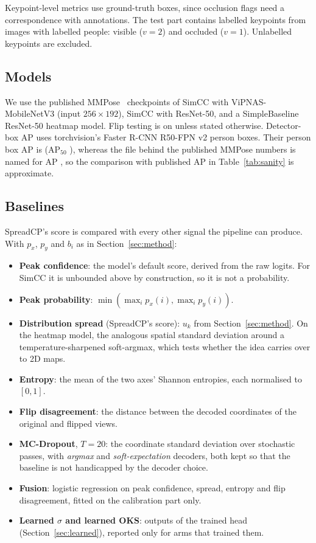 \documentclass[preprint,11pt]{elsarticle}
\newcommand{\method}{SpreadCP}
\begin{document}
Keypoint-level metrics use ground-truth boxes, since occlusion flags need a correspondence with
annotations. The test part contains \numKptTest{} labelled keypoints from \numImgKptTest{} images
with labelled people: \numVisTest{} visible ($v{=}2$) and \numOccTest{} occluded ($v{=}1$).
Unlabelled keypoints are excluded.

\subsection{Models}

We use the published MMPose~\cite{mmpose2020} checkpoints of SimCC with ViPNAS-MobileNetV3
(input $256\times192$), SimCC with ResNet-50, and a SimpleBaseline ResNet-50 heatmap model. Flip
testing is on unless stated otherwise. Detector-box AP uses torchvision's Faster R-CNN R50-FPN v2
person boxes. Their person box AP is \detBoxAp{} (AP$_{50}$ \detBoxApFifty{}), whereas the file
behind the published MMPose numbers is named for AP \detBoxApPublished{}, so the comparison with
published AP in Table~\ref{tab:sanity} is approximate.

\subsection{Baselines}\label{sec:signals}

\method{}'s score is compared with every other signal the pipeline can produce. With $p_x$, $p_y$ and
$b_i$ as in Section~\ref{sec:method}:
\begin{itemize}
\item \textbf{Peak confidence}: the model's default score, derived from the raw logits. For
SimCC it is unbounded above by construction, so it is not a probability.
\item \textbf{Peak probability}: $\min(\max_i p_x(i), \max_i p_y(i))$.
\item \textbf{Distribution spread} (\method{}'s score): $u_k$ from Section~\ref{sec:method}. On the
heatmap model, the analogous spatial standard deviation around a temperature-sharpened soft-argmax,
which tests whether the idea carries over to 2D maps.
\item \textbf{Entropy}: the mean of the two axes' Shannon entropies, each normalised to $[0,1]$.
\item \textbf{Flip disagreement}: the distance between the decoded coordinates of the original
and flipped views.
\item \textbf{MC-Dropout}, $T{=}20$: the coordinate standard deviation over stochastic passes,
with \emph{argmax} and \emph{soft-expectation} decoders, both kept so that the baseline is not
handicapped by the decoder choice.
\item \textbf{Fusion}: logistic regression on peak confidence, spread, entropy and flip
disagreement, fitted on the calibration part only.
\item \textbf{Learned $\sigma$ and learned OKS}: outputs of the trained head
(Section~\ref{sec:learned}), reported only for arms that trained them.
\end{itemize}
\end{document}
